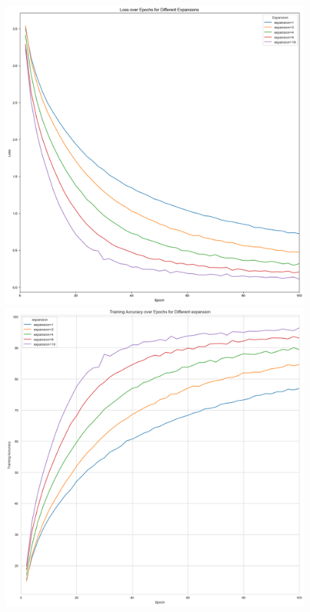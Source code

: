\documentclass[10pt,twocolumn,letterpaper]{article}
\begin{document}
\begin{figure}[htbp]
   \centering
   \begin{minipage}[t]{0.33\textwidth}
      \centering
      \includegraphics[width=\textwidth]{Fig/6.png}
   \end{minipage}
   \begin{minipage}[t]{0.33\textwidth}
      \centering
      \includegraphics[width=\textwidth]{Fig/7.png}

\end{minipage}
\end{figure}
\end{document}

